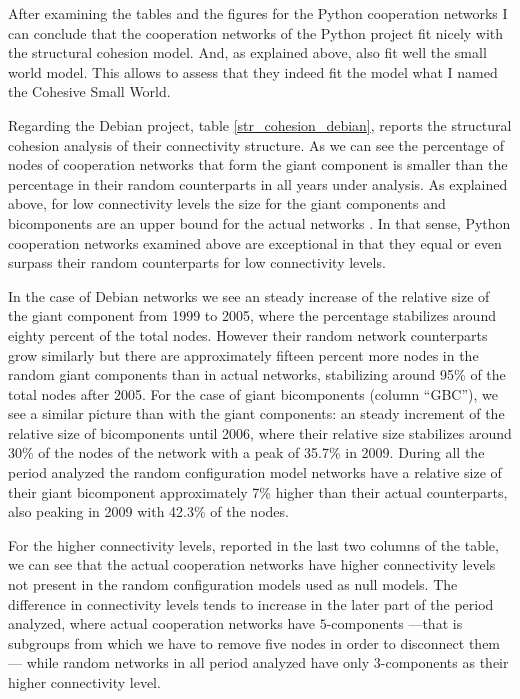 After examining the tables and the figures for the Python cooperation networks I can conclude that the cooperation networks of the Python project fit nicely with the structural cohesion model. And, as explained above, also fit well the small world model. This allows to assess that they indeed fit the model what I named the Cohesive Small World.



Regarding the Debian project, table \ref{str_cohesion_debian}, reports the structural cohesion analysis of their connectivity structure. As we can see the percentage of nodes of cooperation networks that form the giant component is smaller than the percentage in their random counterparts in all years under analysis. As explained above, for low connectivity levels the size for the giant components and bicomponents are an upper bound for the actual networks \citep{moody:2004}. In that sense, Python cooperation networks examined above are exceptional in that they equal or even surpass their random counterparts for low connectivity levels.

In the case of Debian networks we see an steady increase of the relative size of the giant component from 1999 to 2005, where the percentage stabilizes around eighty percent of the total nodes. However their random network counterparts grow similarly but there are approximately fifteen percent more nodes in the random giant components than in actual networks, stabilizing around 95\% of the total nodes after 2005. For the case of giant bicomponents (column ``GBC''), we see a similar picture than with the giant components: an steady increment of the relative size of bicomponents until 2006, where their relative size stabilizes around 30\% of the nodes of the network with a peak of 35.7\% in 2009. During all the period analyzed the random configuration model networks have a relative size of their giant bicomponent approximately 7\% higher than their actual counterparts, also peaking in 2009 with 42.3\% of the nodes.   

For the higher connectivity levels, reported in the last two columns of the table, we can see that the actual cooperation networks have higher connectivity levels not present in the random configuration models used as null models. The difference in connectivity levels tends to increase in the later part of the period analyzed, where actual cooperation networks have $5$-components ---that is subgroups from which we have to remove five nodes in order to disconnect them--- while random networks in all period analyzed have only $3$-components as their higher connectivity level.


